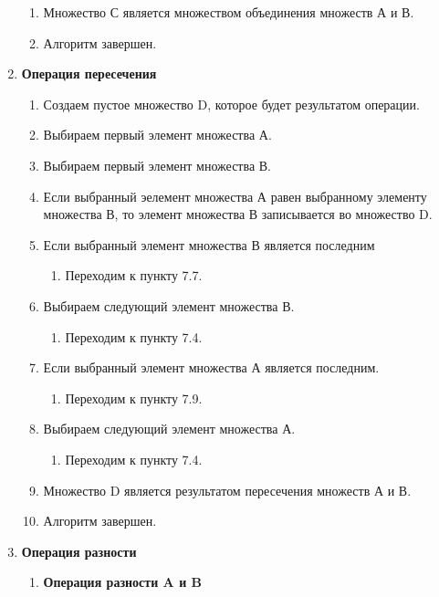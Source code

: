 \documentclass[a4paper,12pt]{extarticle}
\begin{document}
\begin{enumerate}
\begin{enumerate}[label*=\arabic*.]
    \item Множество С является множеством объединения множеств А и В.
    \item Алгоритм завершен.
  \end{enumerate}
  \item \textbf{Операция пересечения}
  \begin{enumerate}[label*=\arabic*.]
    \item Создаем пустое множество D, которое будет результатом операции.
    \item Выбираем первый элемент множества А.
    \item Выбираем первый элемент множества В.
    \item Если выбранный эелемент множества А равен выбранному элементу множества В, то элемент множества В записывается во множество D.
    \item Если выбранный элемент множества В является последним
    \begin{enumerate}[label*=\arabic*.]
      \item Переходим к пункту 7.7.
    \end{enumerate}
    \item Выбираем следующий элемент множества В.
    \begin{enumerate}[label*=\arabic*.]
      \item Переходим к пункту 7.4.
    \end{enumerate}
    \item Если выбранный элемент множества А является последним.
    \begin{enumerate}[label*=\arabic*.]
      \item Переходим к пункту 7.9.
    \end{enumerate}
    \item Выбираем следующий элемент множества А.
    \begin{enumerate}[label*=\arabic*.]
      \item Переходим к пункту 7.4.
    \end{enumerate}
    \item Множество D является результатом пересечения множеств А и В.
    \item Алгоритм завершен.
  \end{enumerate}
  \item \textbf{Операция разности}
  \begin{enumerate}[label*=\arabic*.]
  \item \textbf{Операция разности A и B}
  \begin{enumerate}[label*=\arabic*.]

\end{enumerate}
\end{enumerate}
\end{enumerate}
\end{document}
